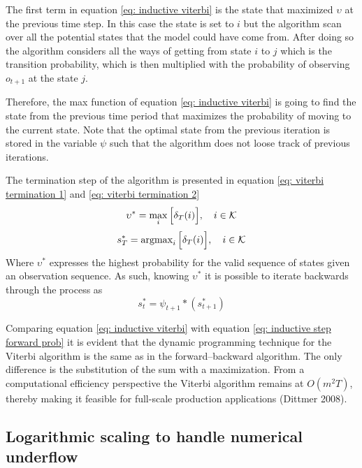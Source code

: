 The first term in equation \ref{eq: inductive viterbi} is the state that maximized $\upsilon$ at the previous time step. In this case the state is set to $i$ but the algorithm scan over all the potential states that the model could have come from. After doing so the algorithm considers all the ways of getting from state  $i$ to $j$ which is the transition probability, which is then multiplied with the probability of observing $o_{t+1}$ at the state $j$. 

Therefore, the max function of equation \ref{eq: inductive viterbi} is going to find the state from the previous time period that maximizes the probability of moving to the current state. Note that the optimal state from the previous iteration is stored in the variable $\psi$ such that the algorithm does not loose track of previous iterations. 

The termination step of the algorithm is presented in equation \ref{eq: viterbi termination 1} and \ref{eq: viterbi termination 2}
\begin{equation}
    \upsilon^* = \max_{i}\Big[\delta_T(i)\Big],
    \quad i \in\operatorname{\mathcal{K}}
    \label{eq: viterbi termination 1}
\end{equation}
 \begin{equation}
     s_T^*= \operatorname{argmax}_{i}\Big[\delta_T(i)\Big],
     \quad i \in\operatorname{\mathcal{K}}
     \label{eq: viterbi termination 2}
 \end{equation}
Where $\upsilon^*$ expresses the highest probability for the valid sequence of states given an observation sequence. As such, knowing $\upsilon^*$ it is possible to iterate backwards through the process as
\begin{equation}
    s_t^* = \psi_{t+1}*(s_{t+1}^*)
\end{equation}

Comparing equation \ref{eq: inductive viterbi} with equation \ref{eq: inductive step forward prob} it is evident that the dynamic programming technique for the Viterbi algorithm is the same as in the forward–backward
algorithm. The only difference is the substitution of the sum with a maximization. From a computational efficiency perspective the Viterbi algorithm remains at $O(m^2T)$, thereby making it feasible for full-scale production applications (Dittmer 2008).

\subsection{Logarithmic scaling to handle numerical underflow}

